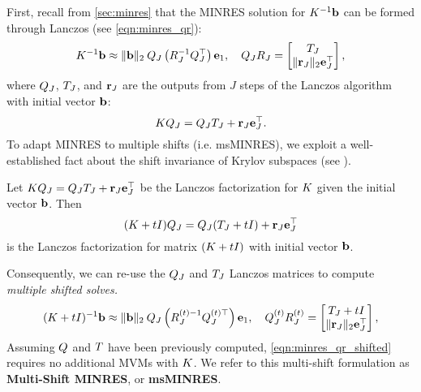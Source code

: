 First, recall from \cref{sec:minres} that the MINRES solution for $K^{-1} \mathbf{b}$ can be formed through Lanczos (see \cref{eqn:minres_qr}):
\begin{equation}
  K^{-1} \mathbf{b} \approx \Vert \mathbf{b} \Vert_2 \: Q_J \left( R^{-1}_J Q_J^\top \right) \mathbf{e}_1,
  \quad
  Q_J R_J = \begin{bmatrix} T_J \\ \Vert \mathbf{r}_J \Vert_2 \mathbf{e}_J^\top \end{bmatrix},
  \label{eqn:minres_qr2}
\end{equation}
where $Q_J$, $T_J$, and $\mathbf{r}_J$ are the outputs from $J$ steps of the Lanczos algorithm with initial vector $\mathbf{b}$:
\[
  K Q_J = Q_J T_J + \mathbf{r}_J \mathbf{e}_J^\top.
\]
To adapt MINRES to multiple shifts (i.e. msMINRES), we exploit a well-established fact about the shift invariance of Krylov subspaces (see \citep[e.g.][]{datta1991arnoldi,freund1990conjugate,jegerlehner1996krylov,saad2003iterative}).
%
\begin{observation}
  Let $K Q_J = Q_J T_J + \mathbf{r}_J \mathbf{e}_J^\top$ be the Lanczos factorization for $K$ given the initial vector $\mathbf{b}$.
  Then $$(K + t I) Q_J = Q_J (T_J + t I) + \mathbf{r}_J \mathbf{e}_J^\top$$ is the Lanczos factorization for matrix $(K + t I)$ with initial vector $\mathbf{b}$.
\end{observation}
%
\noindent
Consequently, we can re-use the $Q_J$ and $T_J$ Lanczos matrices to compute \emph{multiple shifted solves.}
%
\begin{equation}
  (K + t I)^{-1} \mathbf{b} \approx \Vert \mathbf{b} \Vert_2 \: Q_J \left( R^{(t){-1}}_J Q_J^{(t)\top} \right) \mathbf{e}_1,
  \quad
  Q_J^{(t)} R_J^{(t)} = \begin{bmatrix} T_J + t I \\ \Vert \mathbf{r}_J \Vert_2 \mathbf{e}_J^\top \end{bmatrix},
  \label{eqn:minres_qr_shifted}
\end{equation}
%
Assuming $Q$ and $T$ have been previously computed, \cref{eqn:minres_qr_shifted} requires no additional MVMs with $K$.
We refer to this multi-shift formulation as {\bf Multi-Shift MINRES}, or {\bf msMINRES}.



